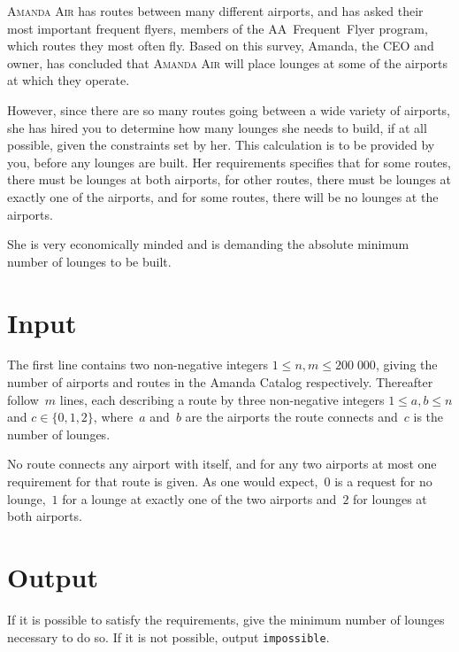 
\textsc{Amanda Air} has routes between many different airports, and
has asked their most important frequent flyers, members of the
AA~Frequent~Flyer program, which routes they most often fly.  Based on
this survey, Amanda, the CEO and owner, has concluded that
\textsc{Amanda Air} will place lounges at some of the airports at
which they operate.

However, since there are so many routes going between a wide variety
of airports, she has hired you to determine how many lounges she needs
to build, if at all possible, given the constraints set by her.  This
calculation is to be provided by you, before any lounges are built.
Her requirements specifies that for some routes, there must be lounges
at both airports, for other routes, there must be lounges at exactly
one of the airports, and for some routes, there will be no lounges at the airports.


She is very economically minded and is demanding the absolute minimum
number of lounges to be built.

\section*{Input}
The first line contains two non-negative integers $1 \leq n,m \leq
200\;000$, giving the number of airports and routes in the Amanda
Catalog respectively.  Thereafter follow~$m$ lines, each describing a
route by three non-negative integers $1 \leq a, b \leq n$ and $c \in
\{0,1,2\}$, where~$a$ and~$b$ are the airports the route connects
and~$c$ is the number of lounges.

No route connects any airport
with itself, and for any two airports at most one requirement for that
route is given.  As one would expect,~$0$ is a request for no
lounge,~$1$ for a lounge at exactly one of the two airports and~$2$
for lounges at both airports.

\section*{Output}
If it is possible to satisfy the requirements, give the minimum number
of lounges necessary to do so.  If it is not possible, output
\texttt{impossible}.
